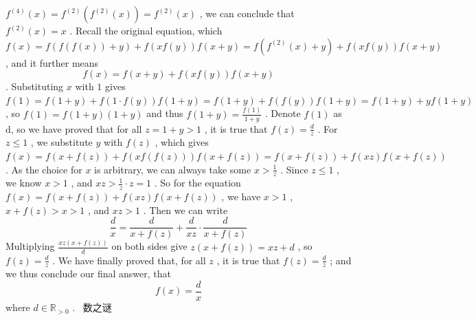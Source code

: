 \documentclass[12pt]{article}
\begin{document}
$f^{(4)}(x)=f^{(2)}(f^{(2)}(x))=f^{(2)}(x)$ , we can conclude that $f^{(2)}(x)=x$ . Recall the original equation, which $f(x)=f(f(f(x))+y)+f(xf(y))f(x+y)=f(f^{(2)}(x)+y)+f(xf(y))f(x+y)$ , and it further means \[f(x)=f(x+y)+f(xf(y))f(x+y)\] . Substituting $x$ with $1$ gives $f(1)=f(1+y)+f(1\cdot f(y))f(1+y)=f(1+y)+f(f(y))f(1+y)=f(1+y)+yf(1+y)$ , so $f(1)=f(1+y)(1+y)$ and thus $f(1+y)=\frac{f(1)}{1+y}$ . Denote $f(1)$ as d, so we have proved that for all $z=1+y>1$ , it is true that $f(z)=\frac{d}{z}$ . For $z\leq 1$ , we substitute $y$ with $f(z)$ , which gives $f(x)=f(x+f(z))+f(xf(f(z)))f(x+f(z))=f(x+f(z))+f(xz)f(x+f(z))$ . As the choice for $x$ is arbitrary, we can always take some $x>\frac{1}{z}$ . Since $z\leq 1$ , we know $x>1$ , and $xz>\frac{1}{z}\cdot z=1$ . So for the equation $f(x)=f(x+f(z))+f(xz)f(x+f(z))$ , we have $x>1$ , $x+f(z)>x>1$ , and $xz>1$ . Then we can write \[\frac{d}{x}=\frac{d}{x+f(z)}+\frac{d}{xz}\cdot\frac{d}{x+f(z)}\] Multiplying $\frac{xz(x+f(z))}{d}$ on both sides give $z(x+f(z))=xz+d$ , so $f(z)=\frac{d}{z}$ . We have finally proved that, for all $z$ , it is true that $f(z)=\frac{d}{z}$ ; and we thus conclude our final answer, that \[\boxed{f(x)=\frac{d}{x}}\] where $d\in\mathbb{R}_{>0}$ . ~数之谜
\end{document}
